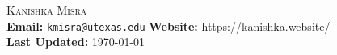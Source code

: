 \documentclass[11pt]{article}
\begin{document}
\begin{center}
\textsc{\LARGE Kanishka Misra} \\
\vspace{0.5em}
\textbf{Email:} \href{mailto:kmisra@utexas.edu}{\texttt{kmisra@utexas.edu}} \hspace{1em}
\textbf{Website:} \url{https://kanishka.website/}\\
\textbf{Last Updated:} \today
\end{center}


\end{document}
